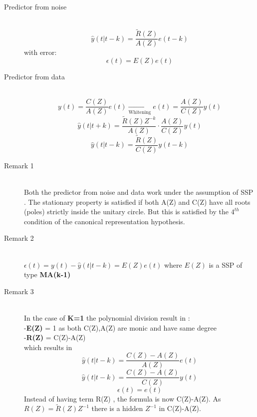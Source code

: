 \begin{description}
\item[Predictor from noise]\hfill\\
\[
\boxed{\hat{y}(t|t-k) = \frac{\tilde{R}(Z)}{A(Z)}e(t-k)}
\]
with error:
\[
\boxed{\epsilon(t) = E(Z)e(t)}
\]
\item[Predictor from data]\hfill\\
$$ y(t) =\frac{C(Z)}{A(Z)}e(t) \xrightarrow[\text{Whitening}]{}e(t) = \frac{A(Z)}{C(Z)}y(t)$$
$$ \hat{y}(t|t+k) = \frac{\tilde{R}(Z)Z^{-k}}{A(Z)} \cdot \frac{A(Z)}{C(Z)}y(t)$$
\[
\boxed{\hat{y}(t|t-k) = \frac{\tilde{R}(Z)}{C(Z)}y(t-k)}
\]
\item[Remark 1]\hfill\\
Both the predictor from noise and data work under the assumption of SSP . The stationary property is satisfied if both A(Z) and C(Z) have all roots (poles) strictly inside the unitary circle. But this is satisfied by the $4^{th}$ condition of the canonical representation hypothesis.
\item[Remark 2]\hfill\\
$\epsilon(t) = y(t)- \hat{y}(t|t-k)=E(Z)e(t)$ where $E(Z)$ is a SSP of type \textbf{MA(k-1)}
\item[Remark 3]\hfill\\
In the case of \textbf{K=1} the polynomial division result in :\\
-\textbf{E(Z)} = 1 as both C(Z),A(Z) are monic and have same degree\\
-\textbf{R(Z)} = C(Z)-A(Z)\\
which results in 
\[
\boxed{\hat{y}(t|t-k)=\frac{C(Z)-A(Z)}{A(Z)}e(t)}
\]
\[
\boxed{\hat{y}(t|t-k)=\frac{C(Z)-A(Z)}{C(Z)}y(t)}
\]
\[
\boxed{\epsilon(t)=e(t)}
\]
Instead of having term R(Z) , the formula is now C(Z)-A(Z). As $R(Z)= \tilde{R}(Z)Z^{-1}$ there is a hidden $Z^{-1}$ in C(Z)-A(Z).
\end{description}

